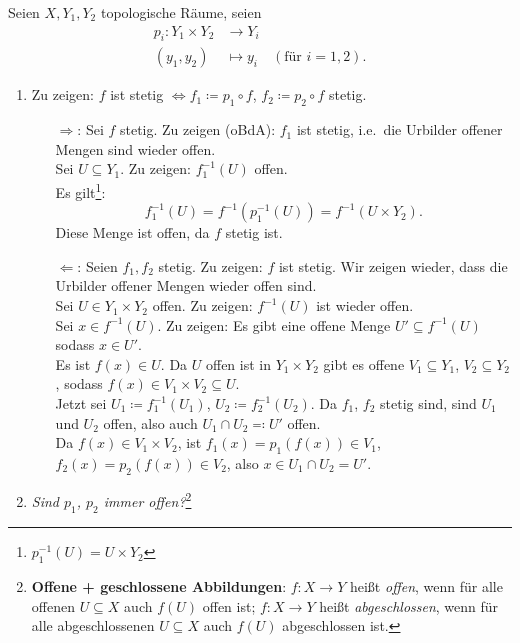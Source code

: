 \begin{solution}
  Seien \( X, Y_1, Y_2 \) topologische Räume, seien
  \begin{align*}
    p_i: Y_1 \times Y_2 &\to Y_i \\
    (y_1, y_2) &\mapsto y_i \quad (\text{für } i = 1,2)\text{.}
  \end{align*}
  \begin{enumerate}
    \item Zu zeigen: \( f \) ist stetig \( \Leftrightarrow f_1 \coloneqq p_1 \circ f \), \( f_2 \coloneqq p_2 \circ f \) stetig. \\
    \begin{itemize}
      \item[\( \Rightarrow \):] Sei \( f \) stetig. Zu zeigen (oBdA): \( f_1 \) ist stetig, i.e.\ die Urbilder offener Mengen sind wieder offen. \\
      Sei \( U \subseteq Y_1 \). Zu zeigen: \( f_1^{-1}(U) \) offen. \\
      Es gilt\footnote{\( p_1^{-1}(U) = U \times Y_2 \) }:
      \begin{equation*}
        f_1^{-1}(U) = f^{-1}(p_1^{-1}(U)) = f^{-1}(U \times Y_2)\text{.}
      \end{equation*}
      Diese Menge ist offen, da \( f \) stetig ist.
      \item[\( \Leftarrow \):] Seien \( f_1, f_2 \) stetig. Zu zeigen: \( f \) ist stetig. Wir zeigen wieder, dass die Urbilder offener Mengen wieder offen sind. \\
      Sei \( U \in Y_1 \times Y_2 \) offen. Zu zeigen: \( f^{-1}(U) \) ist wieder offen. \\
      Sei \( x \in f^{-1}(U) \). Zu zeigen: Es gibt eine offene Menge \( U' \subseteq f^{-1}(U) \) sodass \( x \in U' \). \\
      Es ist \( f(x) \in U \). Da \( U \) offen ist in \( Y_1 \times Y_2 \) gibt es offene \( V_1 \subseteq Y_1 \), \( V_2 \subseteq Y_2 \), sodass \( f( x) \in V_1 \times V_2 \subseteq U \). \\
      Jetzt sei \( U_1 \coloneqq f_1^{-1}(U_1) \), \( U_2 \coloneqq f_2^{-1}(U_2) \). Da \( f_1 \), \( f_2 \) stetig sind, sind \( U_1 \) und \( U_2 \) offen, also auch \( U_1 \cap U_2 \eqqcolon U' \) offen. \\
      Da \( f( x) \in V_1 \times V_2 \), ist \( f_1( x) = p_1(f(x)) \in V_1 \), \( f_2(x) = p_2(f(x)) \in V_2 \), also \( x \in U_1 \cap U_2 = U' \).
    \end{itemize}
    \newpage
    \item \emph{Sind \( p_1 \), \( p_2 \) immer offen?}\footnote{\textbf{Offene + geschlossene Abbildungen}: \( f: X \to Y \) heißt \emph{offen}, wenn für alle offenen \( U \subseteq X \) auch \( f(U) \) offen ist; \( f: X \to Y \) heißt \emph{abgeschlossen}, wenn für alle abgeschlossenen \( U \subseteq X \) auch \( f(U) \) abgeschlossen ist.}
    

\end{enumerate}
\end{solution}
